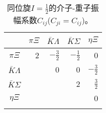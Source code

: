 \begin{table}[h]
\centering
\caption[同位旋$I=\frac{1}{2}$的介子-重子振幅系数$C_{ij}$]{同位旋$I=\frac{1}{2}$的介子-重子振幅系数$C_{ij}$($C_{ji}=C_{ij}$)。}
\label{iCij}
\begin{spacing}{1.5}
\setlength{\tabcolsep}{10mm}
\begin{tabular}{c|rrrr}
	\toprule
	\hline
	~ & $\pi\Xi$ & $\bar{K}\Lambda$ & $\bar{K}\Sigma$ & $\eta\Xi$\\\hline
	$\pi\Xi$ & 2 & $-\frac{3}{2}$ & $-\frac{1}{2}$ &0 \\
	$\bar{K}\Lambda$ & ~ & 0 & 0 &$-\frac{3}{2}$ \\
	$\bar{K}\Sigma$ & ~ & ~ & 2 &$\frac{3}{2}$ \\
	$\eta\Xi$ & ~ & ~ & ~ &0 \\
	\Xhline{1pt}
\end{tabular}
\end{spacing}
\end{table}
